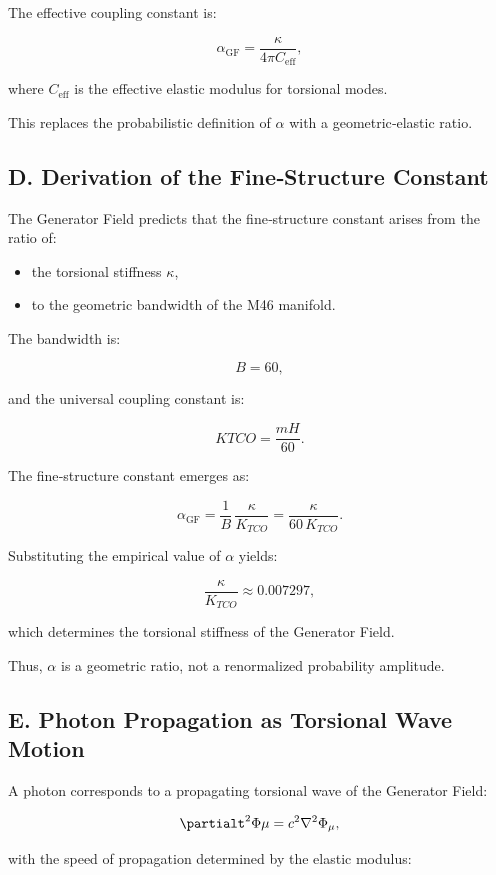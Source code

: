 \documentclass[reprint,amsmath,amssymb,aps,prl,floatfix]{revtex4-2}
\begin{document}
The effective coupling constant is:

\[
\alpha_{\mathrm{GF}}
=
\frac{\kappa}{4\pi C_{\mathrm{eff}}},
\]

where \(C_{\mathrm{eff}}\) is the effective elastic modulus for torsional modes.

This replaces the probabilistic definition of \(\alpha\) with a geometric‑elastic ratio.

\subsection{D. Derivation of the Fine‑Structure Constant}

The Generator Field predicts that the fine‑structure constant arises from the ratio of:

\begin{itemize}
      \item the torsional stiffness \(\kappa\),  
      \item to the geometric bandwidth of the M46 manifold.
\end{itemize}

The bandwidth is:

\[
B = 60,
\]

and the universal coupling constant is:

\[
K{TCO} = \frac{mH}{60}.
\]

The fine‑structure constant emerges as:

\[
\alpha_{\mathrm{GF}}
=
\frac{1}{B}\,
\frac{\kappa}{K_{TCO}}
=
\frac{\kappa}{60\,K_{TCO}}.
\]

Substituting the empirical value of \(\alpha\) yields:

\[
\frac{\kappa}{K_{TCO}}
\approx 0.007297,
\]

which determines the torsional stiffness of the Generator Field.

Thus, \(\alpha\) is a geometric ratio, not a renormalized probability amplitude.

\subsection{E. Photon Propagation as Torsional Wave Motion}

A photon corresponds to a propagating torsional wave of the Generator Field:

\[
\partialt^2 \Phi\mu
=
c^2 \nabla^2 \Phi_\mu,
\]

with the speed of propagation determined by the elastic modulus:
\end{document}
